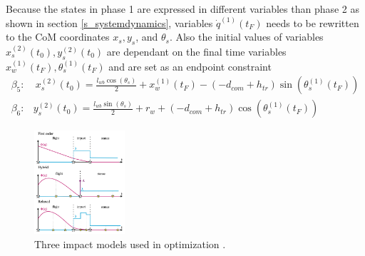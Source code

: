 Because the states in phase 1 are expressed in different variables than phase 2 as shown in section \ref{s_systemdynamics}, variables $\dot q^{(1)}(t_F)$ needs to be rewritten to the CoM coordinates $x_s,y_s$, and $\theta_s$. Also the initial values of variables $x_s^{(2)}(t_0), y_s^{(2)}(t_0)$ are dependant on the final time variables $x_w^{(1)}(t_F), \theta_s^{(1)}(t_F)$ and are set as an endpoint constraint
\footnotesize
\begin{equation}
\begin{split}
\beta_5:& \ x_s^{(2)}(t_0) = \frac{l_{w b} \cos \left(\theta_s\right)}{2}+x_w^{(1)}(t_F)-\left(-d_{c o m}+h_{t r}\right) \sin \left(\theta_s^{(1)}(t_F)\right) \\
\beta_6:& y_s^{(2)}(t_0) = \frac{l_{w b} \sin \left(\theta_s\right)}{2}+r_w+\left(-d_{c o m}+h_{t r}\right) \cos \left(\theta_s^{(1)}(t_F)\right)
\end{split}
\end{equation}
\normalsize
\begin{figure}
\centerline{\includegraphics[width=0.3\textwidth]{figure/impactmethods.png}}
\caption{Three impact models used in optimization \cite{patel_contact-implicit_2019}. }
\label{f_discontinuities}
\end{figure}

